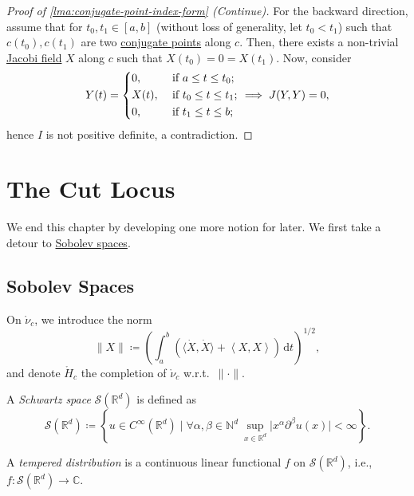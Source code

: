 \begin{proof}[Proof of \autoref{lma:conjugate-point-index-form} (Continue)]
	For the backward direction, assume that for \(t_0, t_1\in [a, b]\) (without loss of generality, let \(t_0 < t_1\)) such that \(c(t_0), c(t_1)\) are two \hyperref[def:conjugate-point]{conjugate points} along \(c\). Then, there exists a non-trivial \hyperref[def:Jacobi-field]{Jacobi field} \(X\) along \(c\) such that \(X(t_0) = 0 = X(t_1)\). Now, consider
	\[
		Y(t) = \begin{dcases}
			0,    & \text{ if } a \leq t \leq t_0 ;   \\
			X(t), & \text{ if } t_0 \leq t \leq t_1 ; \\
			0,    & \text{ if } t_1 \leq t \leq b;
		\end{dcases} \implies J(Y, Y) = 0,
	\]
	hence \(I\) is not positive definite, a contradiction.
\end{proof}

\section{The Cut Locus}
We end this chapter by developing one more notion for later. We first take a detour to \hyperref[def:Sobolev-space]{Sobolev spaces}.

\subsection{Sobolev Spaces}
On \(\mathring{\nu }_c\), we introduce the norm
\[
	\lVert X \rVert \coloneqq \left( \int_{a}^{b} \left( \langle \dot{X} , \dot{X} \rangle + \left\langle X, X \right\rangle  \right)  \,\mathrm{d}t \right) ^{1 / 2},
\]
and denote \(\mathring{H}_c\) the completion of \(\mathring{\nu}_c\) w.r.t.\ \(\lVert \cdot \rVert \).

\begin{definition}\label{def:Schwartz-space}
	A \emph{Schwartz space} \(\mathcal{S} (\mathbb{R} ^d)\) is defined as
	\[
		\mathcal{S} (\mathbb{R} ^d) \coloneqq \left\{ u\in C^{\infty} (\mathbb{R} ^d) \mid \forall \alpha , \beta \in \mathbb{N} ^d\ \sup _{x\in \mathbb{R} ^d} \vert x^\alpha \partial ^\beta u(x) \vert < \infty  \right\} .
	\]
\end{definition}

\begin{definition}\label{def:tempered-distribution}
	A \emph{tempered distribution} is a continuous linear functional \(f\) on \(\mathcal{S} (\mathbb{R} ^d)\), i.e., \(f\colon \mathcal{S} (\mathbb{R} ^d) \to \mathbb{C} \).
\end{definition}

